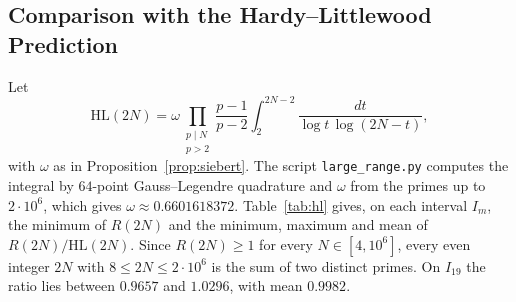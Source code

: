 \documentclass[11pt]{amsart}
\theoremstyle{definition}
\theoremstyle{remark}
\begin{document}
\subsection{Comparison with the Hardy--Littlewood Prediction}\label{subsec:hl-data}
Let
\[
\mathrm{HL}(2N)=\omega\prod_{\substack{p\mid N\\ p>2}}\frac{p-1}{p-2}\int_{2}^{2N-2}\frac{dt}{\log t\,\log(2N-t)},
\]
with $\omega$ as in Proposition~\ref{prop:siebert}. The script \texttt{large\_range.py} computes the integral by $64$-point Gauss--Legendre quadrature and $\omega$ from the primes up to $2\cdot 10^6$, which gives $\omega\approx 0.6601618372$. Table~\ref{tab:hl} gives, on each interval $I_m$, the minimum of $R(2N)$ and the minimum, maximum and mean of $R(2N)/\mathrm{HL}(2N)$. Since $R(2N)\geq 1$ for every $N\in[4,10^6]$, every even integer $2N$ with $8\leq 2N\leq 2\cdot 10^6$ is the sum of two distinct primes. On $I_{19}$ the ratio lies between $0.9657$ and $1.0296$, with mean $0.9982$.
\end{document}
